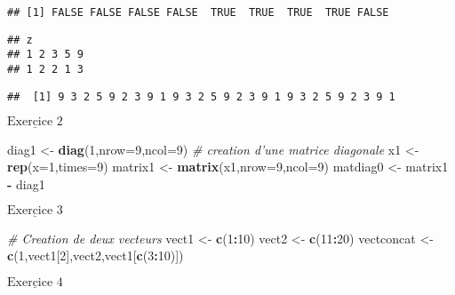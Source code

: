 \documentclass[]{article}
\newenvironment{Shaded}{\begin{snugshade}}{\end{snugshade}}
\newcommand{\CommentTok}[1]{\textcolor[rgb]{0.56,0.35,0.01}{\textit{#1}}}
\newcommand{\DataTypeTok}[1]{\textcolor[rgb]{0.13,0.29,0.53}{#1}}
\newcommand{\DecValTok}[1]{\textcolor[rgb]{0.00,0.00,0.81}{#1}}
\newcommand{\KeywordTok}[1]{\textcolor[rgb]{0.13,0.29,0.53}{\textbf{#1}}}
\newcommand{\NormalTok}[1]{#1}
\newcommand{\OperatorTok}[1]{\textcolor[rgb]{0.81,0.36,0.00}{\textbf{#1}}}
\newcommand{\StringTok}[1]{\textcolor[rgb]{0.31,0.60,0.02}{#1}}
\begin{document}
\begin{verbatim}
## [1] FALSE FALSE FALSE FALSE  TRUE  TRUE  TRUE  TRUE FALSE
\end{verbatim}

\begin{verbatim}
## z
## 1 2 3 5 9 
## 1 2 2 1 3
\end{verbatim}

\begin{verbatim}
##  [1] 9 3 2 5 9 2 3 9 1 9 3 2 5 9 2 3 9 1 9 3 2 5 9 2 3 9 1
\end{verbatim}

\(\underline{\text{Exercice 2}}\)

\begin{Shaded}
\begin{Highlighting}[]
\NormalTok{diag1 <-}\StringTok{ }\KeywordTok{diag}\NormalTok{(}\DecValTok{1}\NormalTok{,}\DataTypeTok{nrow=}\DecValTok{9}\NormalTok{,}\DataTypeTok{ncol=}\DecValTok{9}\NormalTok{) }\CommentTok{# creation d'une matrice diagonale}
\NormalTok{x1 <-}\StringTok{ }\KeywordTok{rep}\NormalTok{(}\DataTypeTok{x=}\DecValTok{1}\NormalTok{,}\DataTypeTok{times=}\DecValTok{9}\NormalTok{)}
\NormalTok{matrix1 <-}\StringTok{ }\KeywordTok{matrix}\NormalTok{(x1,}\DataTypeTok{nrow=}\DecValTok{9}\NormalTok{,}\DataTypeTok{ncol=}\DecValTok{9}\NormalTok{)}
\NormalTok{matdiag0 <-}\StringTok{ }\NormalTok{matrix1 }\OperatorTok{-}\StringTok{ }\NormalTok{diag1}
\end{Highlighting}
\end{Shaded}

\(\underline{\text{Exercice 3}}\)

\begin{Shaded}
\begin{Highlighting}[]
\CommentTok{# Creation de deux vecteurs}
\NormalTok{vect1 <-}\StringTok{ }\KeywordTok{c}\NormalTok{(}\DecValTok{1}\OperatorTok{:}\DecValTok{10}\NormalTok{)}
\NormalTok{vect2 <-}\StringTok{ }\KeywordTok{c}\NormalTok{(}\DecValTok{11}\OperatorTok{:}\DecValTok{20}\NormalTok{)}
\NormalTok{vectconcat <-}\StringTok{ }\KeywordTok{c}\NormalTok{(}\DecValTok{1}\NormalTok{,vect1[}\DecValTok{2}\NormalTok{],vect2,vect1[}\KeywordTok{c}\NormalTok{(}\DecValTok{3}\OperatorTok{:}\DecValTok{10}\NormalTok{)])}
\end{Highlighting}
\end{Shaded}

\(\underline{\text{Exercice 4}}\)
\end{document}
